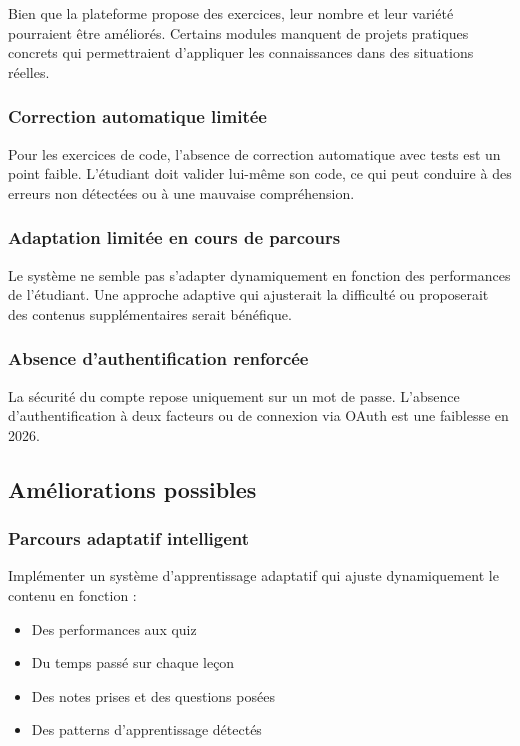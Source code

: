 \documentclass[12pt,a4paper]{article}
\begin{document}
Bien que la plateforme propose des exercices, leur nombre et leur variété pourraient être améliorés. Certains modules manquent de projets pratiques concrets qui permettraient d'appliquer les connaissances dans des situations réelles.

\subsubsection{Correction automatique limitée}

Pour les exercices de code, l'absence de correction automatique avec tests est un point faible. L'étudiant doit valider lui-même son code, ce qui peut conduire à des erreurs non détectées ou à une mauvaise compréhension.

\subsubsection{Adaptation limitée en cours de parcours}

Le système ne semble pas s'adapter dynamiquement en fonction des performances de l'étudiant. Une approche adaptive qui ajusterait la difficulté ou proposerait des contenus supplémentaires serait bénéfique.

\subsubsection{Absence d'authentification renforcée}

La sécurité du compte repose uniquement sur un mot de passe. L'absence d'authentification à deux facteurs ou de connexion via OAuth est une faiblesse en 2026.

\subsection{Améliorations possibles}

\subsubsection{Parcours adaptatif intelligent}

Implémenter un système d'apprentissage adaptatif qui ajuste dynamiquement le contenu en fonction :
\begin{itemize}
    \item Des performances aux quiz
    \item Du temps passé sur chaque leçon
    \item Des notes prises et des questions posées
    \item Des patterns d'apprentissage détectés
\end{itemize}
\end{document}
